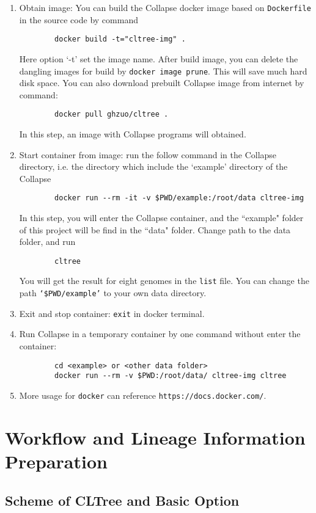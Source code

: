 \documentclass[12pt,a4paper]{article}
\begin{document}
\begin{enumerate}
	\item Obtain image: You can build the Collapse docker image based on {\tt Dockerfile} in the source code by command \begin{verbatim}
		docker build -t="cltree-img" .
		\end{verbatim}
		Here option `-t' set the image name. After build image, you can delete the dangling images for build by {\tt docker image prune}. This will save much hard disk space. You can also download prebuilt Collapse image from internet by command: 
		\begin{verbatim}
		docker pull ghzuo/cltree .
		\end{verbatim} 
		In this step, an image with Collapse programs will obtained.
	\item Start container from image: run the follow command in the Collapse directory, i.e. the directory which include the `example' directory of the Collapse
		\begin{verbatim}
		docker run --rm -it -v $PWD/example:/root/data cltree-img
		\end{verbatim} 
		In this step, you will enter the Collapse container, and the ``example" folder of this project will be find in the ``data" folder. Change path to the data folder, and run 
		\begin{verbatim}
		cltree 
		\end{verbatim}
		You will get the result for eight genomes in the {\tt list} file. You can change the path {\tt `\$PWD/example'} to your own data directory.
	\item Exit and stop container: {\tt exit} in docker terminal.
	\item Run Collapse in a temporary container by one command without enter the container: 
		\begin{verbatim}
		cd <example> or <other data folder>
		docker run --rm -v $PWD:/root/data/ cltree-img cltree
		\end{verbatim} 
	\item More usage for {\tt docker} can reference {\tt https://docs.docker.com/}.
\end{enumerate}


\section{Workflow and Lineage Information Preparation}

\subsection{Scheme of CLTree and Basic Option}
\end{document}
